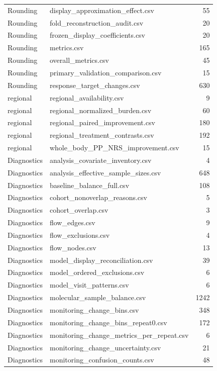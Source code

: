 \begin{longtable}{p{20mm}p{115mm}r}
Rounding & display\_approximation\_effect.csv & 55 \\
Rounding & fold\_reconstruction\_audit.csv & 20 \\
Rounding & frozen\_display\_coefficients.csv & 20 \\
Rounding & metrics.csv & 165 \\
Rounding & overall\_metrics.csv & 45 \\
Rounding & primary\_validation\_comparison.csv & 15 \\
Rounding & response\_target\_changes.csv & 630 \\
regional & regional\_availability.csv & 9 \\
regional & regional\_normalized\_burden.csv & 60 \\
regional & regional\_paired\_improvement.csv & 180 \\
regional & regional\_treatment\_contrasts.csv & 192 \\
regional & whole\_body\_PP\_NRS\_improvement.csv & 15 \\
Diagnostics & analysis\_covariate\_inventory.csv & 4 \\
Diagnostics & analysis\_effective\_sample\_sizes.csv & 648 \\
Diagnostics & baseline\_balance\_full.csv & 108 \\
Diagnostics & cohort\_nonoverlap\_reasons.csv & 5 \\
Diagnostics & cohort\_overlap.csv & 3 \\
Diagnostics & flow\_edges.csv & 9 \\
Diagnostics & flow\_exclusions.csv & 4 \\
Diagnostics & flow\_nodes.csv & 13 \\
Diagnostics & model\_display\_reconciliation.csv & 39 \\
Diagnostics & model\_ordered\_exclusions.csv & 6 \\
Diagnostics & model\_visit\_patterns.csv & 6 \\
Diagnostics & molecular\_sample\_balance.csv & 1242 \\
Diagnostics & monitoring\_change\_bins.csv & 348 \\
Diagnostics & monitoring\_change\_bins\_repeat0.csv & 172 \\
Diagnostics & monitoring\_change\_metrics\_per\_repeat.csv & 6 \\
Diagnostics & monitoring\_change\_uncertainty.csv & 21 \\
Diagnostics & monitoring\_confusion\_counts.csv & 48 \\

\end{longtable}
